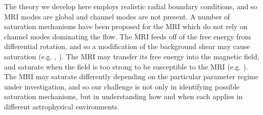 \documentclass{emulateapj}
\newcommand{\citei}[1]{\citeauthor{#1} \citeyear{#1}}
\begin{document}

The theory we develop here employs realistic radial boundary conditions, and so MRI modes are global and channel modes are not present. A number of saturation mechanisms have been proposed for the MRI which do not rely on channel modes dominating the flow. The MRI feeds off of the free energy from differential rotation, and so a modification of the background shear may cause saturation (e.g. \citei{Knobloch:2005ba}, \citei{Umurhan:2007hs}). The MRI may transfer its free energy into the magnetic field, and saturate when the field is too strong to be susceptible to the MRI (e.g. \citei{Ebrahimi:2009ey}). The MRI may saturate differently depending on the particular parameter regime under investigation, and so our challenge is not only in identifying possible saturation mechanisms, but in understanding how and when each applies in different astrophysical environments.
\end{document}
